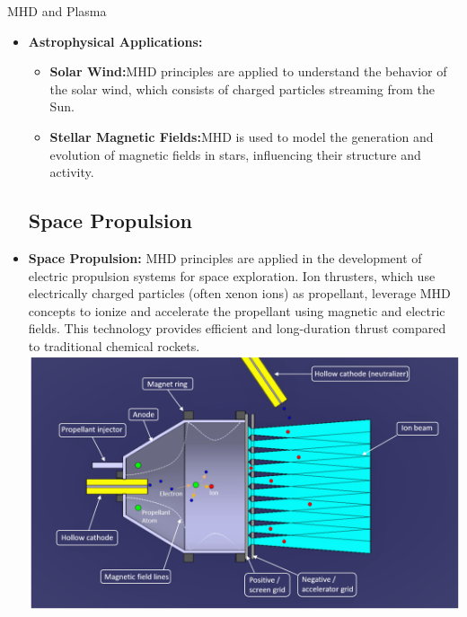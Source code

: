 \documentclass[13pt]{beamer}
\begin{document}
\begin{frame}[t,allowframebreaks]{MHD and Plasma}
\begin{itemize}
	 Devices like tokamaks and stellarators use magnetic fields to confine and stabilize the plasma,\framebreak preventing it from touching the walls of the containment vessel and facilitating controlled fusion reactions.
		\subsection{Astrophysical Applications}
		\item	\textbf{Astrophysical Applications:}
		\begin{itemize}
			\item	\textbf{Solar Wind:}MHD principles are applied to understand the  behavior of the solar wind, which consists of charged particles streaming from the Sun.

			\item	\textbf{	Stellar Magnetic Fields:}MHD is used to model the generation and evolution of magnetic fields in stars, influencing their structure and activity.
		\end{itemize}
	\subsection{Space Propulsion}
	\item	\textbf{	Space Propulsion:} MHD principles are applied in the development of electric propulsion systems for space exploration.
	\framebreak
	Ion thrusters, which use electrically charged particles (often xenon ions) as propellant, leverage MHD concepts to ionize and accelerate the propellant using magnetic and electric fields. This technology provides efficient and long-duration thrust compared to traditional chemical rockets.\\
\centering
\href{https://www.mdpi.com/applsci/applsci-13-05600/article_deploy/html/images/applsci-13-05600-g001.png}{
\includegraphics[width=0.8\textheight]{Images/ion thustors.jpg}
}


	\end{itemize}
\end{frame}
\end{document}
